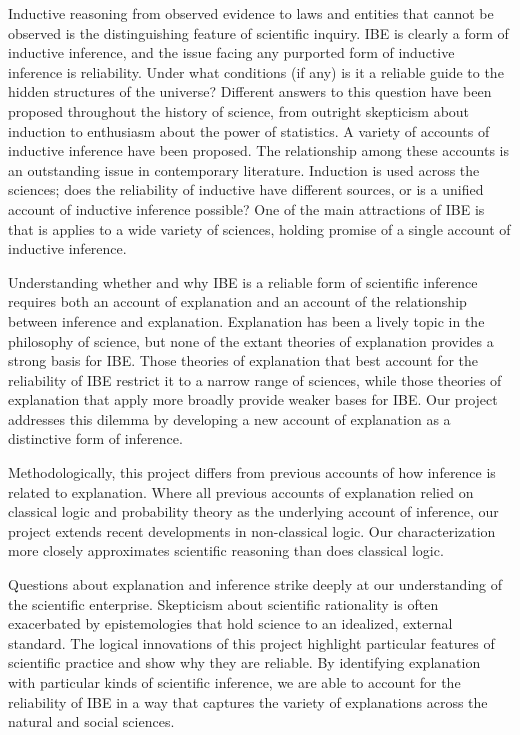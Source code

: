 \documentclass{article}[11pt]
\begin{document}
Inductive reasoning from observed evidence to laws and entities that cannot be observed is the distinguishing feature of scientific inquiry.  IBE is clearly a form of inductive inference, and the issue facing any purported form of inductive inference is reliability.  Under what conditions (if any) is it a reliable guide to the hidden structures of the universe? Different answers to this question have been proposed throughout the history of science, from outright skepticism about induction to enthusiasm about the power of statistics.  A variety of accounts of inductive inference have been proposed.  The relationship among these accounts is an outstanding issue in contemporary literature.  Induction is used across the sciences; does the reliability of inductive have different sources, or is a unified account of inductive inference possible?  One of the main attractions of IBE is that is applies to a wide variety of sciences, holding promise of a single account of inductive inference.

Understanding whether and why IBE is a reliable form of scientific inference requires both an account of explanation and an account of the relationship between inference and explanation.  Explanation has been a lively topic in the philosophy of science, but none of the extant theories of explanation provides a strong basis for IBE.  Those theories of explanation that best account for the reliability of IBE restrict it to a narrow range of sciences, while those theories of explanation that apply more broadly provide weaker bases for IBE.  Our project addresses this dilemma by developing a new account of explanation as a distinctive form of inference. 

Methodologically, this project differs from previous accounts of how inference is related to explanation. Where all previous accounts of explanation relied on classical logic and probability theory as the underlying account of inference, our project extends recent developments in non-classical logic. Our characterization more closely approximates scientific reasoning than does classical logic.  

Questions about explanation and inference strike deeply at our understanding of the scientific enterprise.  Skepticism about scientific rationality is often exacerbated by epistemologies that hold science to an idealized, external standard.  The logical innovations of this project highlight particular features of scientific practice and show why they are reliable.  By identifying explanation with particular kinds of scientific inference, we are able to account for the reliability of IBE in a way that captures the variety of explanations across the natural and social sciences.   
\end{document}
